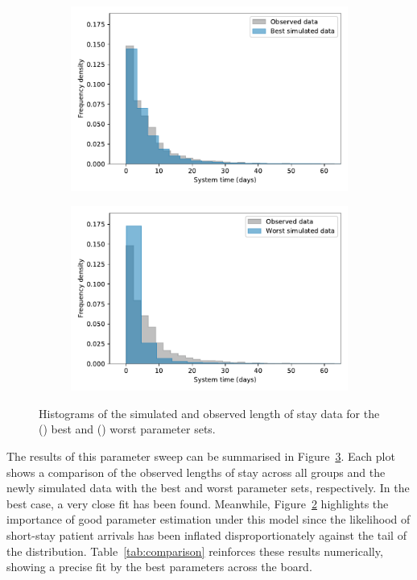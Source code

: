 \documentclass[11pt]{article}
\newlength{\imgwidth}
\begin{document}
\begin{figure}
    \centering%
    \begin{subfigure}{.5\imgwidth}
        \includegraphics[width=\linewidth]{img_best_params}
        \caption{}\label{fig:best_params}
    \end{subfigure}\hfill%
    \begin{subfigure}{.5\imgwidth}
        \includegraphics[width=\linewidth]{img_worst_params}
        \caption{}\label{fig:worst_params}
    \end{subfigure}
    \caption{Histograms of the simulated and observed length of stay data for
             the () best and ()
             worst parameter sets.}\label{fig:params}
\end{figure}

The results of this parameter sweep can be summarised in
Figure~\ref{fig:params}. Each plot shows a comparison of the observed lengths of
stay across all groups and the newly simulated data with the best and worst
parameter sets, respectively. In the best case, a very close fit has been found.
Meanwhile, Figure~\ref{fig:worst_params} highlights the importance of good
parameter estimation under this model since the likelihood of short-stay patient
arrivals has been inflated disproportionately against the tail of the
distribution. Table~\ref{tab:comparison} reinforces these results numerically,
showing a precise fit by the best parameters across the board.
\end{document}
